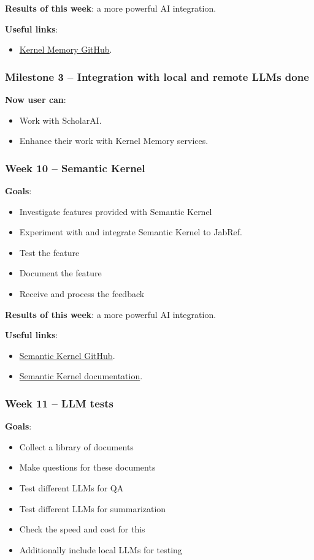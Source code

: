 \documentclass{article}
\begin{document}
	\textbf{Results of this week}: a more powerful AI integration.
	
	\textbf{Useful links}:
	\begin{itemize}
		\item \href{https://github.com/microsoft/kernel-memory?tab=readme-ov-file#kernel-memory}{Kernel Memory GitHub}.
	\end{itemize}
	
	\subsubsection{Milestone 3 -- Integration with local and remote LLMs done}
	\textbf{Now user can}:
	\begin{itemize}
		\item Work with ScholarAI.
		\item Enhance their work with Kernel Memory services.
	\end{itemize}
	
	\subsubsection{Week 10 -- Semantic Kernel}
	\textbf{Goals}:
	\begin{itemize}
		\item Investigate features provided with Semantic Kernel
		\item Experiment with and integrate Semantic Kernel to JabRef.
		\item Test the feature
		\item Document the feature
		\item Receive and process the feedback
	\end{itemize}
	
	\textbf{Results of this week}: a more powerful AI integration.
	
	\textbf{Useful links}:
	\begin{itemize}
		\item \href{https://github.com/microsoft/semantic-kernel}{Semantic Kernel GitHub}.
		\item \href{https://learn.microsoft.com/en-us/semantic-kernel/agents/kernel/?tabs=Csharp}{Semantic Kernel documentation}.
	\end{itemize}
	
	\subsubsection{Week 11 -- LLM tests}
	\textbf{Goals}:
	\begin{itemize}
		\item Collect a library of documents
		\item Make questions for these documents
		\item Test different LLMs for QA
		\item Test different LLMs for summarization
		\item Check the speed and cost for this
		\item Additionally include local LLMs for testing
	\end{itemize}
	
\end{document}
